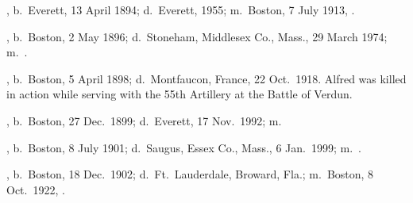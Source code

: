 \begin{Kids}
	, b.\ Everett, 13 April 1894;\cite{Robert5McGurinBirth} d.\ Everett, 1955;\cite{Robert5McGurinDeath} m.\ Boston, 7 July 1913, .\cite{Robert5McGurinMarriage}
	
	, b.\ Boston, 2 May 1896;\cite{Walter5McGurinBirth} d.\ Stoneham, Middlesex Co., Mass., 29 March 1974;\cite{Walter5McGurinDeath:1} m.\ .\cite{Walter5McGurinDeath:2}
	
	, b.\ Boston, 5 April 1898;\cite{Alfred5McGurinBirth} d.\ Montfaucon, France, 22 Oct.\ 1918.\cite{Alfred5McGurinDeath} Alfred was killed in action while serving with the 55th Artillery at the Battle of Verdun.\cite{Alfred5McGurinDeath2}
	
	, b.\ Boston, 27 Dec.\ 1899;\cite{Margaret5McGurinBirth} d.\ Everett, 17 Nov.\ 1992;\cite{Margaret5McGurinDeath:1} m.\ \cite{Margaret5McGurinDeath:2}
	
	, b.\ Boston, 8 July 1901;\cite{Sarah5McGurinBirth} d.\ Saugus, Essex Co., Mass., 6 Jan.\ 1999;\cite{Sarah5McGurinDeath:1} m.\ .\cite{Sarah5McGurinDeath:2}
	
	, b.\ Boston, 18 Dec.\ 1902;\cite{Edward5McGurinBirth} d.\ Ft.\ Lauderdale, Broward, Fla.;\cite{Edward5McGurinDeath} m.\ Boston, 8 Oct.\ 1922, .\cite{Edward5McGurinMarriage}
	

\end{Kids}
